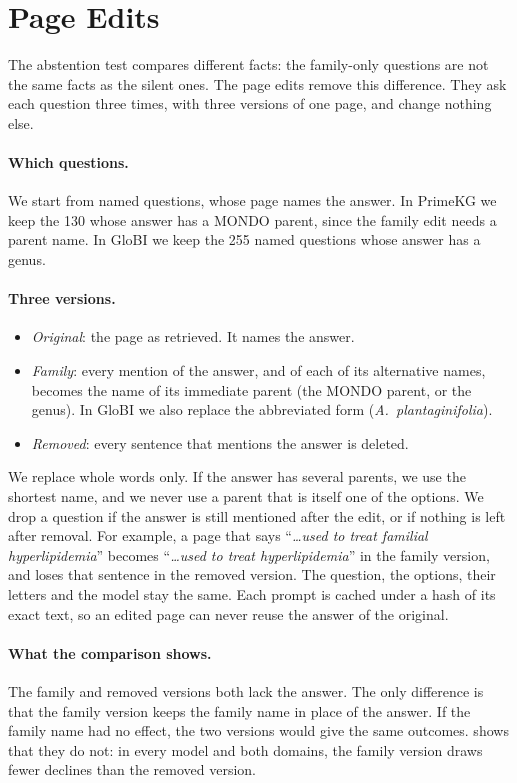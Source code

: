 \section{Page Edits}
\label{app:edits}

The abstention test compares different facts: the family-only questions are not the same facts as the silent ones. The page edits remove this difference. They ask each question three times, with three versions of one page, and change nothing else.

\paragraph{Which questions.}
We start from named questions, whose page names the answer. In PrimeKG we keep the 130 whose answer has a MONDO parent, since the family edit needs a parent name. In GloBI we keep the 255 named questions whose answer has a genus.

\paragraph{Three versions.}
\begin{itemize}
\item \emph{Original}: the page as retrieved. It names the answer.
\item \emph{Family}: every mention of the answer, and of each of its alternative names, becomes the name of its immediate parent (the MONDO parent, or the genus). In GloBI we also replace the abbreviated form (\emph{A.~plantaginifolia}).
\item \emph{Removed}: every sentence that mentions the answer is deleted.
\end{itemize}
We replace whole words only. If the answer has several parents, we use the shortest name, and we never use a parent that is itself one of the options. We drop a question if the answer is still mentioned after the edit, or if nothing is left after removal.
For example, a page that says ``\emph{\dots used to treat familial hyperlipidemia}'' becomes ``\emph{\dots used to treat hyperlipidemia}'' in the family version, and loses that sentence in the removed version. The question, the options, their letters and the model stay the same. Each prompt is cached under a hash of its exact text, so an edited page can never reuse the answer of the original.

\paragraph{What the comparison shows.}
The family and removed versions both lack the answer. The only difference is that the family version keeps the family name in place of the answer. If the family name had no effect, the two versions would give the same outcomes.  shows that they do not: in every model and both domains, the family version draws fewer declines than the removed version.

